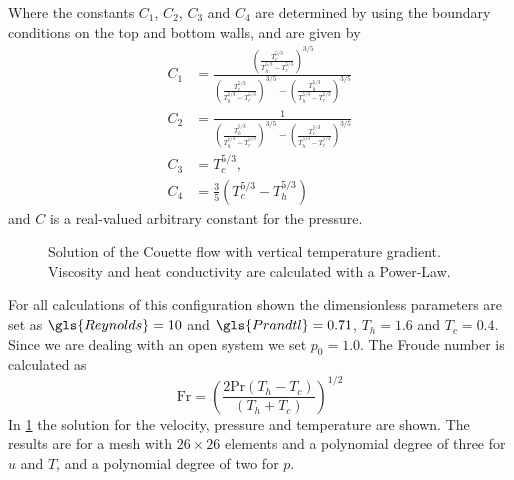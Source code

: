 Where the constants $C_1$, $C_2$, $C_3$ and $C_4$ are determined by using the boundary conditions on the top and bottom walls, and are given by 
\begin{align}
C_1 &= \frac{\left(\frac{T_c^{5/3}}{T_h^{5/3}-T_c^{5/3}}\right)^{3/5}}{\left(\frac{T_c^{5/3}}{T_h^{5/3}-T_c^{5/3}}\right)^{3/5}-\left(\frac{T_h^{5/3}}{T_h^{5/3}-T_c^{5/3}}\right)^{3/5}}\\
C_2 &= \frac{1}{\left(\frac{T_h^{5/3}}{T_h^{5/3}-T_c^{5/3}}\right)^{3/5}-\left(\frac{T_c^{5/3}}{T_h^{5/3}-T_c^{5/3}}\right)^{3/5}}\\
C_3 &= T_c^{5/3},\\
C_4 &= \frac{3}{5}\left(T_c^{5/3}-T_h^{5/3}\right)
\end{align}
and $C$ is a real-valued arbitrary constant for the pressure.%
\begin{center}
\begin{figure}[tb]
	\pgfplotsset{
		group/xticklabels at=edge bottom,
	}
	\caption{Solution of the Couette flow with vertical temperature gradient. Viscosity and heat conductivity are calculated with a Power-Law.}
	\label{fig:CouetteSolution}
\end{figure}
\end{center}
\FloatBarrier
For all calculations of this configuration shown the dimensionless parameters are set as $\gls{Reynolds} = 10$ and $\gls{Prandtl} =0.71$, $T_h = 1.6$ and $T_c = 0.4$. Since we are dealing with an open system we set $p_0 =1.0$. The Froude number is calculated as 
\begin{equation}
\text{Fr} = \left( \frac{2\text{Pr}(T_h-T_c)}{(T_h+T_c)}\right)^{1/2}
\end{equation}
In \cref{fig:CouetteSolution} the solution for the velocity, pressure and temperature are shown. The results are for a mesh with $26\times26$ elements and a polynomial degree of three for $u$ and $T$, and a polynomial degree of two for $p$.

